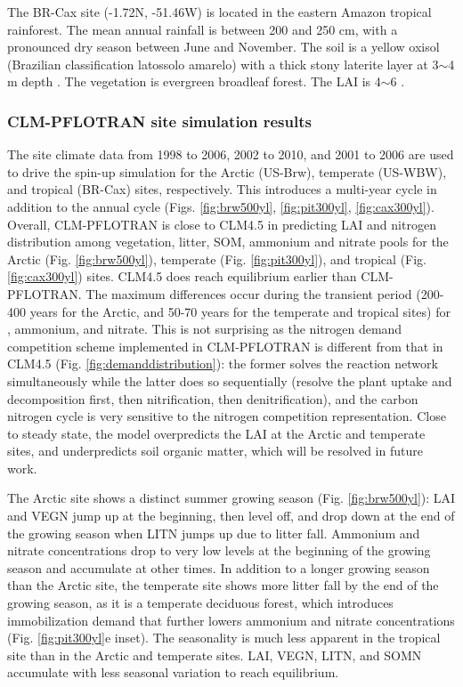 \documentclass[gmd, manuscript]{copernicus}
\begin{document}
The BR-Cax site (-1.72N, -51.46W) is located in the eastern Amazon tropical
rainforest. The mean annual rainfall is between 200 and 250 \unit{cm}, with a
pronounced dry season between June and November. The soil is a yellow oxisol
(Brazilian classification latossolo amarelo) with a thick stony laterite layer
at 3$\sim$4 m depth \citep{daCosta2010}. The vegetation is evergreen
broadleaf forest. The LAI is 4$\sim$6 \citep{Powell2013}. 

\subsubsection{CLM-PFLOTRAN site simulation results}
The site climate data from 1998 to 2006, 2002 to 2010, and 2001 to 2006  are
used to drive the spin-up simulation for the Arctic (US-Brw), temperate
(US-WBW), and tropical (BR-Cax) sites, respectively. This introduces a
multi-year cycle in addition to the annual cycle (Figs. \ref{fig:brw500yl},
\ref{fig:pit300yl}, \ref{fig:cax300yl}). Overall, CLM-PFLOTRAN is close to
CLM4.5 in predicting LAI and nitrogen distribution among vegetation, litter,
SOM, ammonium and nitrate pools for the Arctic (Fig. \ref{fig:brw500yl}),
temperate (Fig. \ref{fig:pit300yl}), and tropical (Fig. \ref{fig:cax300yl})
sites. CLM4.5 does reach equilibrium earlier than CLM-PFLOTRAN. The maximum
differences occur during the transient period (200-400 years for the Arctic, and 50-70
years for the temperate and tropical sites) for , ammonium, and
nitrate. This is not surprising as the nitrogen demand competition
scheme implemented in CLM-PFLOTRAN is different from that in CLM4.5 (Fig.
\ref{fig:demanddistribution}): the former solves the reaction network
simultaneously while the latter does so sequentially (resolve the plant uptake and
decomposition first, then nitrification, then denitrification), and the
carbon nitrogen cycle is very sensitive to the nitrogen competition
representation. Close to steady state, the model overpredicts the LAI at the
Arctic and temperate sites, and underpredicts soil organic matter, which will
be resolved in future work.

The Arctic site shows a distinct summer growing season (Fig.
\ref{fig:brw500yl}): LAI and VEGN jump up at the beginning, then level off, and
drop down at the end of the growing season when LITN jumps up due to litter fall.
Ammonium and nitrate concentrations drop to very low levels at the beginning of
the growing season and accumulate at other times. In addition to a longer growing
season than the Arctic site, the temperate site shows more litter fall by the
end of the growing season, as it is a temperate deciduous forest, which introduces
immobilization demand that further lowers ammonium and nitrate
concentrations (Fig. \ref{fig:pit300yl}e inset). The seasonality is much less
apparent in the tropical site than in the Arctic and temperate sites. LAI,
VEGN, LITN, and SOMN accumulate with less seasonal variation to reach 
equilibrium. 
\end{document}
